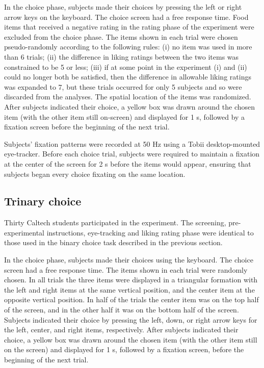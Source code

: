 In the choice phase, subjects made their choices by pressing the left or right arrow keys on the keyboard. The choice screen had a free response time. Food items that received a negative rating in the rating phase of the experiment were excluded from the choice phase. The items shown in each trial were chosen pseudo-randomly according to the following rules: (i) no item was used in more than 6 trials; (ii) the difference in liking ratings between the two items was constrained to be 5 or less; (iii) if at some point in the experiment (i) and (ii) could no longer both be satisfied, then the difference in allowable liking ratings was expanded to 7, but these trials occurred for only 5 subjects and so were discarded from the analyses. The spatial location of the items was randomized. After subjects indicated their choice, a yellow box was drawn around the chosen item (with the other item still on-screen) and displayed for 1 s, followed by a fixation screen before the beginning of the next trial.

Subjects’ fixation patterns were recorded at 50 Hz using a Tobii desktop-mounted eye-tracker. Before each choice trial, subjects were required to maintain a fixation at the center of the screen for 2 s before the items would appear, ensuring that subjects began every choice fixating on the same location.


\subsection{Trinary choice}

Thirty Caltech students participated in the experiment. The screening, pre-experimental instructions, eye-tracking and liking rating phase were identical to those used in the binary choice task described in the previous section.

In the choice phase, subjects made their choices using the keyboard. The choice screen had a free response time. The items shown in each trial were randomly chosen. In all trials the three items were displayed in a triangular formation with the left and right items at the same vertical position, and the center item at the opposite vertical position. In half of the trials the center item was on the top half of the screen, and in the other half it was on the bottom half of the screen. Subjects indicated their choice by pressing the left, down, or right arrow keys for the left, center, and right items, respectively. After subjects indicated their choice, a yellow box was drawn around the chosen item (with the other item still on the screen) and displayed for 1 s, followed by a fixation screen, before the beginning of the next trial.

